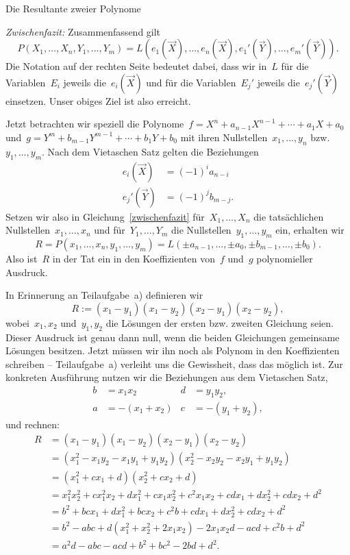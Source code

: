 \documentclass{algblatt}
\begin{document}
\begin{aufgabe}{Die Resultante zweier Polynome}
\begin{loesungE}
\emph{Zwischenfazit:} Zusammenfassend gilt
\begin{equation}\label{zwischenfazit}
  P(X_1,\ldots,X_n, Y_1,\ldots,Y_m) =
  L(e_1(\vec X),\ldots,e_n(\vec X), e_1'(\vec Y),\ldots,e_m'(\vec Y)).
\end{equation}
Die Notation auf der rechten Seite bedeutet dabei, dass wir in~$L$ für die
Variablen~$E_i$ jeweils die~$e_i(\vec X)$ und für die Variablen~$E_j'$ jeweils
die~$e_j'(\vec Y)$ einsetzen. Unser obiges Ziel ist also erreicht.

Jetzt betrachten wir speziell die Polynome~$f = X^n + a_{n-1}X^{n-1} + \cdots +
a_1X + a_0$ und~$g = Y^m + b_{m-1}Y^{m-1} + \cdots + b_1Y + b_0$ mit ihren
Nullstellen~$x_1,\ldots,y_n$ bzw.~$y_1,\ldots,y_m$. Nach dem Vietaschen Satz
gelten die Beziehungen
\begin{align*}
  e_i(\vec X) &= (-1)^i a_{n-i} \\
  e_j'(\vec Y) &= (-1)^j b_{m-j}.
\end{align*}
Setzen wir also in Gleichung~\eqref{zwischenfazit} für~$X_1,\ldots,X_n$ die
tatsächlichen Nullstellen~$x_1,\ldots,x_n$ und für~$Y_1,\ldots,Y_m$ die
Nullstellen~$y_1,\ldots,y_m$ ein, erhalten wir
\[ R = P(x_1,\ldots,x_n,y_1,\ldots,y_m) =
  L(\pm a_{n-1},\ldots,\pm a_0, \pm b_{m-1},\ldots,\pm b_0). \]
Also ist~$R$ in der Tat ein in den Koeffizienten von~$f$ und~$g$ polynomieller
Ausdruck.

\item In Erinnerung an Teilaufgabe~a) definieren wir
\[ R := (x_1 - y_1) (x_1 - y_2) (x_2 - y_1) (x_2 - y_2), \]
wobei~$x_1,x_2$ und~$y_1,y_2$ die Lösungen der ersten bzw. zweiten Gleichung
seien. Dieser Ausdruck ist genau dann null, wenn die beiden Gleichungen
gemeinsame Lösungen besitzen. Jetzt müssen wir ihn noch als Polynom in den
Koeffizienten schreiben -- Teilaufgabe~a) verleiht uns die Gewissheit, dass das
möglich ist. Zur konkreten Ausführung nutzen wir die Beziehungen aus dem
Vietaschen Satz,
\begin{align*}
  b &= x_1 x_2 & d &= y_1 y_2, \\
  a &= -(x_1+x_2) & c &= -(y_1 + y_2),
\end{align*}
und rechnen:
\begin{align*}
  R &= (x_1 - y_1) (x_1 - y_2) (x_2 - y_1) (x_2 - y_2) \\
  &= (x_1^2 - x_1y_2 - x_1y_1 + y_1y_2) (x_2^2 - x_2y_2 - x_2y_1 + y_1y_2) \\
  &= (x_1^2 + cx_1 + d) (x_2^2 + cx_2 + d) \\
  &= x_1^2 x_2^2 + c x_1^2 x_2 + d x_1^2 + c x_1 x_2^2 + c^2 x_1 x_2 +
    c d x_1 + d x_2^2 + cd x_2 + d^2 \\
  &= b^2 + bcx_1 + dx_1^2 + bcx_2 + c^2b + cdx_1 + dx_2^2 + cdx_2 + d^2 \\
  &= b^2 - abc + d(x_1^2 + x_2^2 + 2x_1x_2) - 2x_1x_2d - acd + c^2b + d^2 \\
  &= a^2d - abc - acd + b^2 + bc^2 - 2bd + d^2.
\end{align*}
\end{loesungE}
\end{aufgabe}
\end{document}
